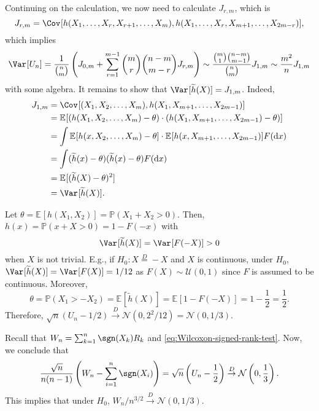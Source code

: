 Continuing on the calculation, we now need to calculate \(J_{r, m}\), which is
\[
	J_{r, m}
	= \Cov_{}[h(X_1, \dots , X_r, X_{r+1}, \dots , X_m), h(X_1, \dots , X_r, X_{m+1}, \dots , X_{2m-r})],
\]
which implies
\[
	\Var_{}[U_n]
	= \frac{1}{\binom{n}{m}} \left( J_{0, m} + \sum_{r=1}^{m-1} \binom{m}{r} \binom{n-m}{m-r} J_{r, m} \right)
	\sim \frac{\binom{m}{1} \binom{n-m}{m-1}}{\binom{n}{m}} J_{1, m}
	\sim \frac{m^2}{n} J_{1, m}
\]
with some algebra. It remains to show that \(\Var_{}[\widetilde{h} (X)] = J_{1, m}\). Indeed,
\[
	\begin{split}
		J_{1, m}
		 & = \Cov_{}[(X_1, X_2, \dots , X_m), h(X_1, X_{m+1}, \dots , X_{2m-1})]                                                       \\
		 & = \mathbb{E}_{}[(h(X_1, X_2, \dots , X_m) - \theta ) \cdot (h(X_1, X_{m+1}, \dots , X_{2m-1}) - \theta ) ]                  \\
		 & = \int \mathbb{E}_{}[h(x, X_2, \dots , X_m) - \theta ] \cdot \mathbb{E}_{}[h(x, X_{m+1}, \dots , X_{2m-1})] F(\mathrm{d} x) \\
		 & = \int (\widetilde{h} (x) - \theta ) (\widetilde{h} (x) - \theta ) F(\mathrm{d} x)                                          \\
		 & = \mathbb{E}_{}[(\widetilde{h} (X) - \theta )^2]                                                                            \\
		 & = \Var_{}[\widetilde{h} (X)] .
	\end{split}
\]

\begin{eg}
	Let \(\theta = \mathbb{E}_{}[h(X_1, X_2)] = \mathbb{P} (X_1 + X_2 > 0)\). Then, \(h(x) = \mathbb{P} (x + X > 0) = 1 - F(-x)\) with
	\[
		\Var_{}[\widetilde{h} (X)]
		= \Var_{}[F(-X)]
		> 0
	\]
	when \(X\) is not trivial. E.g., if \(H_0 \colon X \overset{D}{=} -X \) and \(X\) is continuous, under \(H_0\), \(\Var_{}[\widetilde{h} (X)] = \Var_{}[F(X)] = 1 / 12\) as \(F(X) \sim \mathcal{U} (0, 1)\) since \(F\) is assumed to be continuous. Moreover,
	\[
		\theta
		= \mathbb{P} (X_1 > -X_2)
		= \mathbb{E}_{}[\widetilde{h} (X)]
		= \mathbb{E}_{}[1 - F(-X)]
		= 1 - \frac{1}{2}
		= \frac{1}{2}.
	\]
	Therefore, \(\sqrt{n} ( U_n - 1 / 2 ) \overset{D}{\to} \mathcal{N} ( 0, 2^2 / 12 ) = \mathcal{N} ( 0, 1 / 3 ) \).
\end{eg}

\begin{remark}
	Recall that \(W_n = \sum_{k=1}^{n} \sgn (X_k) R_k\) and \autoref{eq:Wilcoxon-signed-rank-test}. Now, we conclude that
	\[
		\frac{\sqrt{n}}{n(n-1)} \left( W_n - \sum_{i=1}^{n} \sgn (X_i) \right)
		= \sqrt{n} \left( U_n - \frac{1}{2} \right)
		\overset{D}{\to} \mathcal{N} \left( 0, \frac{1}{3} \right).
	\]
	This implies that under \(H_0\), \(W_n / n^{3 / 2} \overset{D}{\to} \mathcal{N} (0, 1 / 3)\).
\end{remark}

